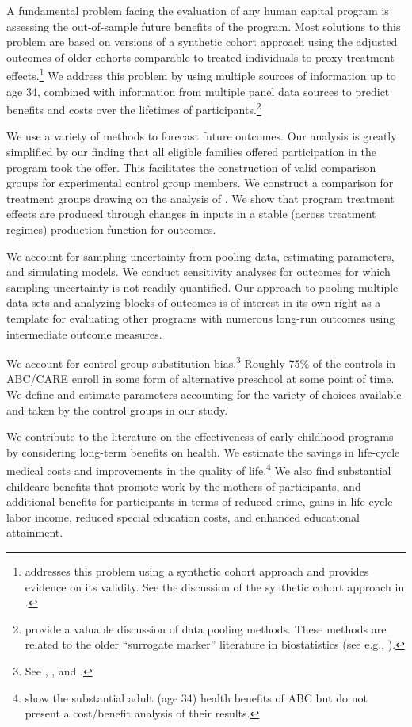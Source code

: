 A fundamental problem facing the evaluation of any human capital program is assessing the out-of-sample future benefits of the program. Most solutions to this problem are based on versions of a synthetic cohort approach using the adjusted outcomes of older cohorts comparable to treated individuals to proxy treatment effects.\footnote{\cite{Mincer_1974_schooling} addresses this problem using a synthetic cohort approach and provides evidence on its validity. See the discussion of the synthetic cohort approach in \cite{Heckman_Lochner_ea_2006_HEE}.} We address this problem by using multiple sources of information up to age 34, combined with information from multiple panel data sources to predict benefits and costs over the lifetimes of participants.\footnote{\citet{Ridder_Moffitt_2007_hbk_metricsdata} provide a valuable discussion of data pooling methods. These methods are related to the older ``surrogate marker'' literature in biostatistics (see e.g., \citealp{Prentice_1989_Surrogate_SiM}).}

We use a variety of methods to forecast future outcomes. Our analysis is greatly simplified by our finding that all eligible families offered participation in the program took the offer. This facilitates the construction of valid comparison groups for experimental control group members. We construct a comparison for treatment groups drawing on the analysis of \citet{Heckman_Pinto_etal_2013_PerryFactor}. We show that program treatment effects are produced through changes in inputs in a stable (across treatment regimes) production function for outcomes.

We account for sampling uncertainty from pooling data, estimating parameters, and simulating models. We conduct sensitivity analyses for outcomes for which sampling uncertainty is not readily quantified. Our approach to pooling multiple data sets and analyzing blocks of outcomes is of interest in its own right as a template for evaluating other programs with numerous long-run outcomes using intermediate outcome measures.

We account for control group substitution bias.\footnote{See \cite{Heckman_1992_randomization}, \cite{Heckman_Hohmann_etal_2000_QJE}, and \cite{Kline_Walters_2016_QJE}.} Roughly 75\% of the controls in ABC/CARE enroll in some form of alternative preschool at some point of time. We define and estimate parameters accounting for the variety of choices available and taken by the control groups in our study.

We contribute to the literature on the effectiveness of early childhood programs by considering long-term benefits on health. We estimate the savings in life-cycle medical costs and improvements in the quality of life.\footnote{\cite{Campbell_Conti_etal_2014_EarlyChildhoodInvestments} show the substantial adult (age 34) health benefits of ABC but do not present a cost/benefit analysis of their results.} We also find substantial childcare benefits that promote work by the mothers of participants, and additional benefits for participants in terms of reduced crime, gains in life-cycle labor income, reduced special education costs, and enhanced educational attainment.

